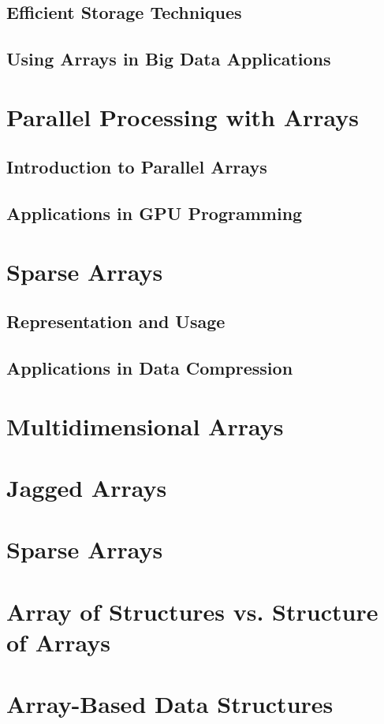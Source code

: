 \documentclass[12pt, oneside]{book}
\begin{document}
	\subsection{Efficient Storage Techniques}
	\subsection{Using Arrays in Big Data Applications}
	
	\section{Parallel Processing with Arrays}
	\subsection{Introduction to Parallel Arrays}
	\subsection{Applications in GPU Programming}
	
	\section{Sparse Arrays}
	\subsection{Representation and Usage}
	\subsection{Applications in Data Compression}
	\section{Multidimensional Arrays}
	\section{Jagged Arrays}
	\section{Sparse Arrays}
	\section{Array of Structures vs. Structure of Arrays}
	\section{Array-Based Data Structures}
	
\end{document}
